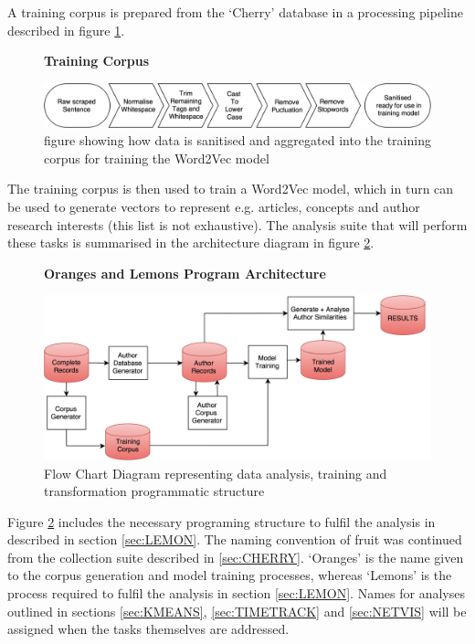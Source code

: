 \documentclass[11pt, oneside]{article}   	%
\begin{document}
A training corpus is prepared from the `Cherry' database in a processing pipeline described in figure \ref{fig:CORPUSGEN}.
\begin{figure}[H]
    \centering
    \textbf{Training Corpus}\par\medskip
    \includegraphics[scale=0.14]{CORPUSGEN.png}
    \caption{figure showing how data is sanitised and aggregated into the training corpus for training the Word2Vec model \label{fig:CORPUSGEN}}
\end{figure}
The training corpus is then used to train a Word2Vec model, which in turn can be used to generate vectors to represent e.g. articles, concepts and author research interests (this list is not exhaustive). The analysis suite that will perform these tasks is summarised in the architecture diagram in figure \ref{fig:ORANGELEMON}.
\begin{figure}[H]
    \centering
    \textbf{Oranges and Lemons Program Architecture}\par\medskip
    \includegraphics[scale=0.14]{ORANGESLEMONS.png}
    \caption{Flow Chart Diagram representing data analysis, training and transformation programmatic structure \label{fig:ORANGELEMON}}
\end{figure}
Figure \ref{fig:ORANGELEMON} includes the necessary programing structure to fulfil the analysis in described in section \ref{sec:LEMON}. The naming convention of fruit was continued from the collection suite described in \ref{sec:CHERRY}. `Oranges' is the name given to the corpus generation and model training processes, whereas `Lemons' is the process required to fulfil the analysis in section \ref{sec:LEMON}. Names for analyses outlined in sections \ref{sec:KMEANS}, \ref{sec:TIMETRACK} and \ref{sec:NETVIS} will be assigned when the tasks themselves are addressed.
\end{document}
